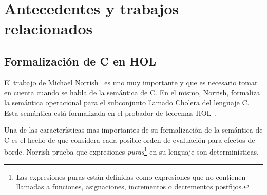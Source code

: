 \chapter{Antecedentes y trabajos relacionados}\label{chapter:previous}

\begin{comment}
Hay una amplia variedad de trabajos relacionados a la formalización de la semántica del lenguaje C.
Limitaremos esta sección a aquellos trabajos que son directamente relevantes al presente.
En este capítulo se procederá a presentar la lista de trabajos previos relacionados a este trabajo.
\end{comment}

\begin{comment}
Primero, se hablará de la formalización de C en HOL de Michael Norrish~\citeyearpar{norrish}.
Este trabajo está relacionado al presente porque formaliza la semántica de un subconjunto de C utilizando HOL y el subconjunto de C para el cual se formaliza la semántica es mas grande que el presentado en este trabajo.

Luego, se discutirá el modelo de memoria utilizado en la verificación formal del compilador CompCert~\citep{leroy-blazy-memory-model}
En el presente trabajo se adopta el modelo de memoria utilizado por el compilador verificado de C del proyecto CompCert.

Finalmente, se mencionará el proyecto Autocorres~\citeyearpar{autocorres}, el cual tiene como fin el abstraer la semántica de bajo nivel de C a una representación de más alto nivel.
Este proyecto traduce código de lenguaje C a la lógica de un probador de teoremas con el fin de poder probar propiedades del código fuente en C.
\end{comment}

\section{Formalización de C en HOL}

El trabajo de Michael Norrish~\citeyearpar{norrish} es uno muy importante y que es necesario tomar en cuenta cuando se habla de la semántica de C.
En el mismo, Norrish, formaliza la semántica operacional para el subconjunto llamado Cholera del lenguaje C.
Esta semántica está formalizada en el probador de teoremas HOL~\citep{hol-doc}.

Una de las características mas importantes de su formalización de la semántica de C es el hecho de que considera cada posible orden de evaluación para efectos de borde.
Norrish prueba que expresiones \textit{puras}\footnote{Las expresiones puras están definidas como expresiones que no contienen llamadas a funciones, asignaciones, incrementos o decrementos postfijos.} en su lenguaje son determinísticas.

